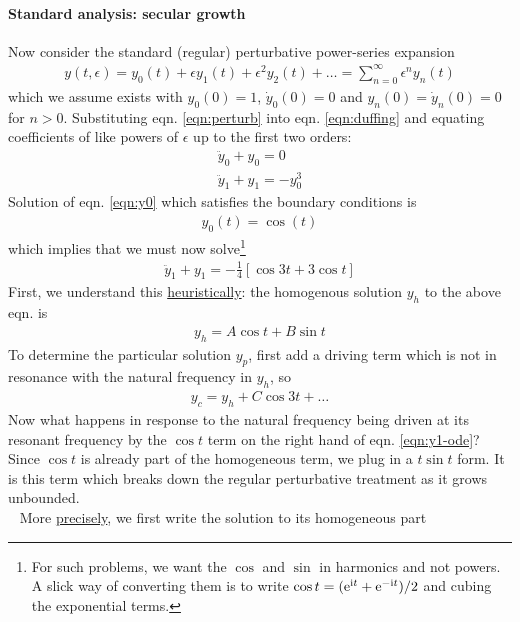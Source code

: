\paragraph{Standard analysis: secular growth} 
Now consider the standard (regular) perturbative power-series expansion
\begin{gather}\label{eqn:perturb}
y(t,\epsilon) = y_0(t) + \epsilon y_1(t) + \epsilon^2 y_2(t) + \dots = \sum_{n=0}^{\infty} \epsilon^n y_n(t)
\end{gather}
which we assume exists with $y_0(0)=1$, $\dot y_0(0)=0$ and $y_n(0)=\dot y_n(0)=0$ for $n>0$. Substituting eqn. \ref{eqn:perturb} into eqn. \ref{eqn:duffing} and equating coefficients of like powers of $\epsilon$ up to the first two orders:
\begin{gather}
\ddot y_0 + y_0 = 0 \label{eqn:y0}\\
\ddot y_1 + y_1 = -y_0^3 \label{eqn:y1}
\end{gather}
Solution of eqn. \ref{eqn:y0} which satisfies the boundary conditions is
\begin{gather}
y_0(t) = \cos (t)
\end{gather}
which implies that we must now solve\footnote{For such problems, we want the $\cos$ and $\sin$ in harmonics and not powers. A slick way of converting them is to write $\cos t = (\mathrm{e}^{\mathrm{i} t} + \mathrm{e}^{-\mathrm{i} t})/2$ and cubing the exponential terms.}
\begin{gather}
\ddot y_1 + y_1 = - \frac{1}{4}\left[\cos 3 t + 3 \cos t\right] \label{eqn:y1-ode}
\end{gather}
First, we understand this \underline{heuristically}: the homogenous solution $y_h$ to the above eqn. is 
\begin{gather*}
	y_h = A \cos t + B \sin t
\end{gather*}
To determine the particular solution $y_p$, first add a driving term which is not in resonance with the natural frequency in $y_h$, so
\begin{gather*}
	y_c = y_h + C \cos 3t + \dots 
\end{gather*}
Now what happens in response to the natural frequency being driven at its resonant frequency by the $\cos t$ term on the right hand of eqn. \ref{eqn:y1-ode}? Since $\cos t$ is already part of the homogeneous term, we plug in a $t \sin t$ form. It is this term which breaks down the regular perturbative treatment as it grows unbounded.\\
\ \newline
More \underline{precisely}, we first write the solution to its homogeneous part
